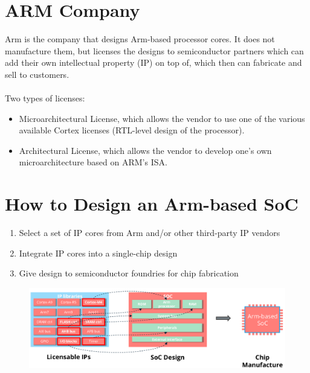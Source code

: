 \section{ARM Company}

Arm is the company that designs Arm-based processor cores. It does not manufacture them, but licenses
the designs to semiconductor partners which can add their own intellectual property (IP) on top of, which
then can fabricate and sell to customers.


\paragraph{}
Two types of licenses:

\begin{itemize}
    \item Microarchitectural License, which allows the vendor to use one of the various available Cortex licenses (RTL-level design of the processor).
    \item Architectural License, which allows the vendor to develop one's own microarchitecture based on ARM's ISA.
\end{itemize}

\section{How to Design an Arm-based SoC}

\begin{enumerate}
    \item Select a set of IP cores from Arm and/or other third-party IP vendors
    \item Integrate IP cores into a single-chip design
    \item Give design to semiconductor foundries for chip fabrication
\end{enumerate}

\begin{figure}[H]
    \centering
    \includegraphics[width=1\linewidth]{img/image8.png}
\end{figure}

